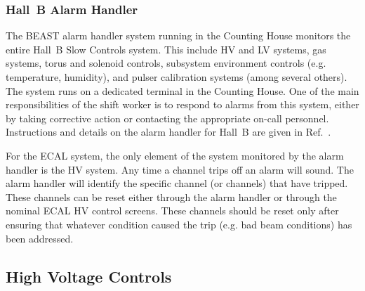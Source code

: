 \documentclass[letterpaper,10pt]{article}
\begin{document}
\subsubsection{Hall~B Alarm Handler}
\label{alarms}

The BEAST alarm handler system running in the Counting House monitors the entire Hall~B Slow Controls
system. This include HV and LV systems, gas systems, torus and solenoid controls, subsystem
environment controls (e.g. temperature, humidity), and pulser calibration systems (among several
others). The system runs on a dedicated terminal in the Counting House. One of the main responsibilities
of the shift worker is to respond to alarms from this system, either by taking corrective action
or contacting the appropriate on-call personnel. Instructions and details on the alarm handler for Hall~B
are given in Ref.~\cite{beast}.

For the ECAL system, the only element of the system monitored by the alarm handler is the HV system.
Any time a channel trips off an alarm will sound. The alarm handler will identify the specific
channel (or channels) that have tripped. These channels can be reset either through the alarm handler
or through the nominal ECAL HV control screens. These channels should be reset only after ensuring
that whatever condition caused the trip (e.g. bad beam conditions) has been addressed.

\subsection{High Voltage Controls}
\label{hv-control}
\end{document}
